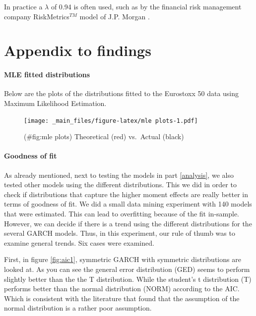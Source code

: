 \documentclass[a4paper, nobind]{templates/ociamthesis}
\begin{document}
In practice a \(\lambda\) of 0.94 is often used, such as by the financial risk management company RiskMetrics\(^{TM}\) model of J.P. Morgan \autocite{morganguarantytrustcompany1996}.

\newpage

\hypertarget{appendix-to-findings}{%
\chapter{Appendix to findings}\label{appendix-to-findings}}

\hypertarget{mle-fitted-distributions}{%
\subsubsection{MLE fitted distributions}\label{mle-fitted-distributions}}

Below are the plots of the distributions fitted to the Eurostoxx 50 data using Maximum Likelihood Estimation.

\begin{figure}
\centering
\texttt{[image: \_main\_files/figure-latex/mle plots-1.pdf]}
\caption{(\#fig:mle plots) Theoretical (red) vs.~Actual (black)}
\end{figure}

\hypertarget{goodness-of-fit}{%
\subsubsection{Goodness of fit}\label{goodness-of-fit}}

\noindent As already mentioned, next to testing the models in part \ref{analysis}, we also tested other models using the different distributions. This we did in order to check if distributions that capture the higher moment effects are really better in terms of goodness of fit. We did a small data mining experiment with 140 models that were estimated. This can lead to overfitting because of the fit in-sample. However, we can decide if there is a trend using the different distributions for the several GARCH models. Thus, in this experiment, our rule of thumb was to examine general trends. Six cases were examined. ~\\

\newpage

\noindent First, in figure \ref{fig:aic1}, symmetric GARCH with symmetric distributions are looked at. As you can see the general error distribution (GED) seems to perform slightly better than the the T distribution. While the student's t distribution (T) performs better than the normal distribution (NORM) according to the AIC. Which is consistent with the literature that found that the assumption of the normal distribution is a rather poor assumption.
\end{document}
